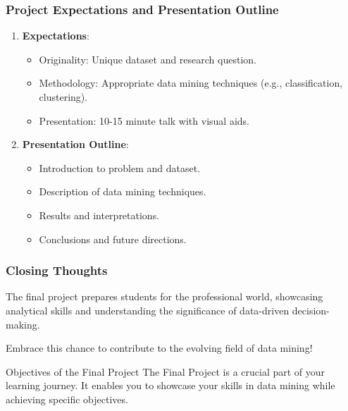 \documentclass[aspectratio=169]{beamer}
\begin{document}
\begin{frame}[fragile]
  \frametitle{Project Expectations and Presentation Outline}
  \begin{enumerate}
    \item \textbf{Expectations}:
      \begin{itemize}
        \item Originality: Unique dataset and research question.
        \item Methodology: Appropriate data mining techniques (e.g., classification, clustering).
        \item Presentation: 10-15 minute talk with visual aids.
      \end{itemize}
    \item \textbf{Presentation Outline}:
      \begin{itemize}
        \item Introduction to problem and dataset.
        \item Description of data mining techniques.
        \item Results and interpretations.
        \item Conclusions and future directions.
      \end{itemize}
  \end{enumerate}
\end{frame}

\begin{frame}[fragile]
  \frametitle{Closing Thoughts}
  \begin{block}{}
    The final project prepares students for the professional world, showcasing analytical skills and understanding the significance of data-driven decision-making.
  \end{block}
  Embrace this chance to contribute to the evolving field of data mining!
\end{frame}

\begin{frame}[fragile]{Objectives of the Final Project}
  The Final Project is a crucial part of your learning journey. It enables you to showcase your skills in data mining while achieving specific objectives. 
\end{frame}
\end{document}

